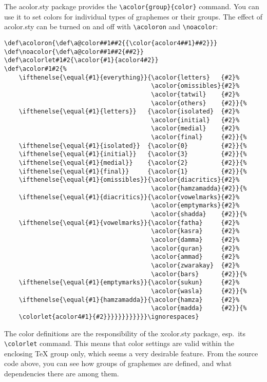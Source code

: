 \documentclass[10pt,a4paper]{article}
\newcommand{\sty}[1]{\textsf{#1.sty}}
\begin{document}
The \sty{acolor} package provides the
\lstinline[emph={[2]group,color},emphstyle={[2]\itshape}]!\acolor{group}{color}!
command. You can use it to set colors for individual types of
graphemes or their groups. The effect of \sty{acolor} can be turned on
and off with \lstinline{\acoloron} and \lstinline{\noacolor}:
\begin{lstlisting}
\def\acoloron{\def\a@color##1##2{{\color{acolor4##1}##2}}}
\def\noacolor{\def\a@color##1##2{##2}}
\def\acolorlet#1#2{\acolor{#1}{acolor4#2}}
\def\acolor#1#2{%
    \ifthenelse{\equal{#1}{everything}}{\acolor{letters}   {#2}%
                                        \acolor{omissibles}{#2}%
                                        \acolor{tatwil}    {#2}%
                                        \acolor{others}    {#2}}{%
    \ifthenelse{\equal{#1}{letters}}   {\acolor{isolated}  {#2}%
                                        \acolor{initial}   {#2}%
                                        \acolor{medial}    {#2}%
                                        \acolor{final}     {#2}}{%
    \ifthenelse{\equal{#1}{isolated}}  {\acolor{0}         {#2}}{%
    \ifthenelse{\equal{#1}{initial}}   {\acolor{3}         {#2}}{%
    \ifthenelse{\equal{#1}{medial}}    {\acolor{2}         {#2}}{%
    \ifthenelse{\equal{#1}{final}}     {\acolor{1}         {#2}}{%
    \ifthenelse{\equal{#1}{omissibles}}{\acolor{diacritics}{#2}%
                                        \acolor{hamzamadda}{#2}}{%
    \ifthenelse{\equal{#1}{diacritics}}{\acolor{vowelmarks}{#2}%
                                        \acolor{emptymarks}{#2}%
                                        \acolor{shadda}    {#2}}{%
    \ifthenelse{\equal{#1}{vowelmarks}}{\acolor{fatha}     {#2}%
                                        \acolor{kasra}     {#2}%
                                        \acolor{damma}     {#2}%
                                        \acolor{quran}     {#2}%
                                        \acolor{ammad}     {#2}%
                                        \acolor{zwarakay}  {#2}%
                                        \acolor{bars}      {#2}}{%
    \ifthenelse{\equal{#1}{emptymarks}}{\acolor{sukun}     {#2}%
                                        \acolor{wasla}     {#2}}{%
    \ifthenelse{\equal{#1}{hamzamadda}}{\acolor{hamza}     {#2}%
                                        \acolor{madda}     {#2}}{%
    \colorlet{acolor4#1}{#2}}}}}}}}}}}}\ignorespaces}
\end{lstlisting}

The color definitions are the responsibility of the \sty{xcolor}
package, esp.~its \lstinline{\colorlet} command. This means that color
settings are valid within the enclosing \TeX{} group only, which seems
a very desirable feature. From the source code above, you can see how
groups of graphemes are defined, and what dependencies there are among
them.
\end{document}
